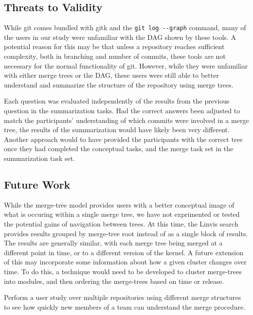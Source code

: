 \subsection{Threats to Validity}
\label{sub:threats_to_validity}

While git comes bundled with gitk and the \verb|git log --graph|
command, many of the users in our study were unfamiliar with the DAG
shown by these tools. A potential reason for this may be that unless a
repository reaches sufficient complexity, both in branching and number
of commits, these tools are not necessary for the normal functionality
of git. However, while they were unfamiliar with either merge trees or
the DAG, these users were still able to better understand and summarize
the structure of the repository using merge trees.

Each question was evaluated independently of the results from the
previous question in the summarization tasks. Had the correct answers
been adjusted to match the participants' understanding of which commits
were involved in a merge tree, the results of the summarization would
have likely been very different. Another approach would to have provided
the participants with the correct tree once they had completed the
conceptual tasks, and the merge task set in the summarization task set.


\subsection{Future Work}
\label{sub:future_work}


While the merge-tree model provides users with a better conceptual image
of what is occuring within a single merge tree, we have not exprimented
or tested the potential gains of navigation between trees. At this time,
the Linvis search provides results grouped by merge-tree root instead of
as a single block of results. The results are generally similar, with
each merge tree being merged at a different point in time, or to a
different version of the kernel. A future extension of this may
incorporate some information about how a given cluster changes over
time. To do this, a technique would need to be developed to cluster
merge-trees into modules, and then ordering the merge-trees based on
time or release.


Perform a user study over multiple repositories using different merge
structures to see how quickly new members of a team can understand the
merge procedure. %


